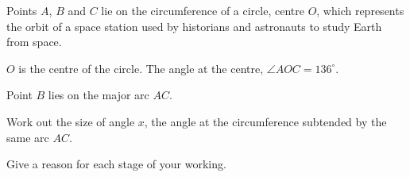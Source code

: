 \begin{question}
\noindent Points $A$, $B$ and $C$ lie on the circumference of a circle, centre $O$, which represents the orbit of a space station used by historians and astronauts to study Earth from space.

\noindent $O$ is the centre of the circle. The angle at the centre, $\angle AOC = 136^\circ$.

\begin{center}
\end{center}

\noindent Point $B$ lies on the major arc $AC$.

\noindent Work out the size of angle $x$, the angle at the circumference subtended by the same arc $AC$.

\noindent Give a reason for each stage of your working.
\vspace{5cm}

\begin{flushright}
\end{flushright}
\end{question}

